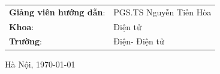 \begin{titlepage}
\begin{center}
\begin{table}[H]
    \centering
    \begin{tabular}{l l}
\textbf{\fontsize{14pt}{0pt}\selectfont Giảng viên hướng dẫn}: & \fontsize{13pt}{0pt}\selectfont PGS.TS Nguyễn Tiến Hòa  \\
\textbf{\fontsize{14pt}{0pt}\selectfont Khoa}: & \fontsize{14pt}{0pt}\selectfont Điện tử \\
\textbf{\fontsize{14pt}{0pt}\selectfont Trường}: & \fontsize{14pt}{0pt}\selectfont Điện- Điện tử \\
\end{tabular}
\end{table}

\vspace{3cm}
 \fontsize{14pt}{0pt}\selectfont Hà Nội, \today
\end{center}
\end{titlepage}
\cleardoublepage


